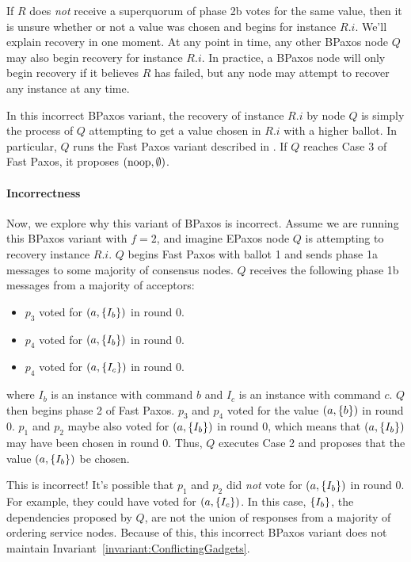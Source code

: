 \documentclass{mwhittaker}
\theoremstyle{definition}
\newcommand{\invref}[1]{Invariant~\ref{invariant:#1}}
\begin{document}
If $R$ does \emph{not} receive a superquorum of phase 2b votes for the same
value, then it is unsure whether or not a value was chosen and begins
 for instance $R.i$. We'll explain recovery in one moment. At
any point in time, any other BPaxos node $Q$ may also begin recovery for
instance $R.i$. In practice, a BPaxos node will only begin recovery if it
believes $R$ has failed, but any node may attempt to recover any instance at
any time.

In this incorrect BPaxos variant, the recovery of instance $R.i$ by node $Q$ is
simply the process of $Q$ attempting to get a value chosen in $R.i$ with a
higher ballot. In particular, $Q$ runs the Fast Paxos variant described in
. If $Q$ reaches Case 3 of Fast Paxos, it proposes $(\text{noop},
\emptyset)$.

\paragraph{Incorrectness}
Now, we explore why this variant of BPaxos is incorrect. Assume we are running
this BPaxos variant with $f = 2$, and imagine EPaxos node $Q$ is attempting to
recovery instance $R.i$. $Q$ begins Fast Paxos with ballot 1 and sends phase 1a
messages to some majority of consensus nodes. $Q$ receives the following phase
1b messages from a majority of acceptors:
\begin{itemize}
  \item
    $p_3$ voted for $(a, \{I_b\})$ in round $0$.
  \item
    $p_4$ voted for $(a, \{I_b\})$ in round $0$.
  \item
    $p_4$ voted for $(a, \{I_c\})$ in round $0$.
\end{itemize}
where $I_b$ is an instance with command $b$ and $I_c$ is an instance with
command $c$.
%
$Q$ then begins phase 2 of Fast Paxos. $p_3$ and $p_4$ voted for the value $(a,
\{b\})$ in round $0$. $p_1$ and $p_2$ maybe also voted for $(a, \{I_b\})$
in round $0$, which means that $(a, \{I_b\})$ may have been chosen in round
$0$. Thus, $Q$ executes Case 2 and proposes that the value $(a, \{I_b\})$ be
chosen.

This is incorrect! It's possible that $p_1$ and $p_2$ did \emph{not} vote for
$(a, \{I_b\})$ in round $0$. For example, they could have voted for $(a,
\{I_c\})$. In this case, $\{I_b\}$, the dependencies proposed by $Q$, are
not the union of responses from a majority of ordering service nodes. Because
of this, this incorrect BPaxos variant does not maintain
\invref{ConflictingGadgets}.
\end{document}
